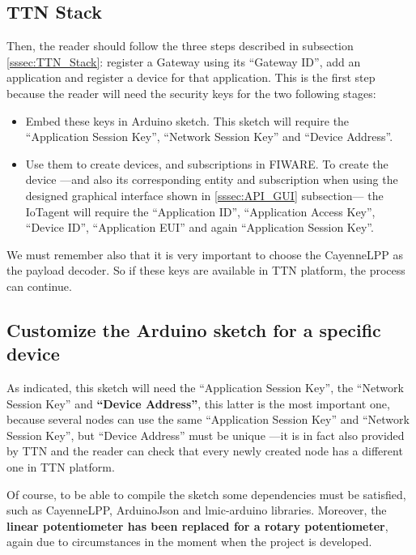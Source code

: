 \documentclass[11pt,a4paper,dvipsnames,twoside]{article}
\begin{document}
\subsection{TTN Stack}
Then, the reader should follow the three steps described in subsection \ref{sssec:TTN_Stack}: register a Gateway using its \enquote{Gateway ID}, add an application and register a device for that application. This is the first step because the reader will need the security keys for the two following stages:

\begin{itemize}
  \item Embed these keys in Arduino sketch. This sketch will require the \enquote{Application Session Key}, \enquote{Network Session Key} and \enquote{Device Address}.
  \item Use them to create devices, and subscriptions in FIWARE. To create the device ---and also its corresponding entity and subscription when using the designed graphical interface shown in \ref{sssec:API_GUI} subsection--- the IoTagent will require the \enquote{Application ID}, \enquote{Application Access Key}, \enquote{Device ID}, \enquote{Application EUI} and again \enquote{Application Session Key}.
\end{itemize}

We must remember also that it is very important to choose the CayenneLPP as the payload decoder. So if these keys are available in TTN platform, the process can continue.

\subsection{Customize the Arduino sketch for a specific device}
As indicated, this sketch will need the \enquote{Application Session Key}, the \enquote{Network Session Key} and \textbf{\enquote{Device Address}}, this latter is the most important one, because several nodes can use the same \enquote{Application Session Key} and \enquote{Network Session Key}, but \enquote{Device Address} must be unique ---it is in fact also provided by TTN and the reader can check that every newly created node has a different one in TTN platform. 

Of course, to be able to compile the sketch some dependencies must be satisfied, such as CayenneLPP, ArduinoJson and lmic-arduino libraries. Moreover, the \textbf{linear potentiometer has been replaced for a rotary potentiometer}, again due to circumstances in the moment when the project is developed.
\end{document}
